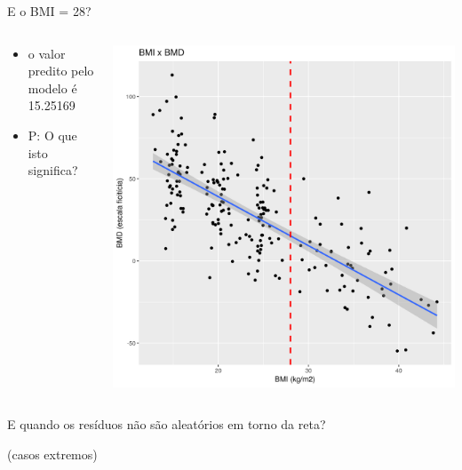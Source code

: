 \documentclass{beamer}
\begin{document}
\begin{frame}{E o BMI = 28?}
  \begin{columns}
    \begin{column}{5cm}
      \begin{itemize}
        \small
      \item o valor predito pelo modelo é 15.25169
      \item P: O que isto significa?
      \end{itemize}
    \end{column}
    \begin{column}{5cm}
      \begin{center}
        \includegraphics[width=1.1\textwidth]{Cap18-19/pratica-plot3}
      \end{center}
    \end{column}
  \end{columns}
\end{frame}

\begin{frame}
  \begin{center}
    \Large
    E quando os resíduos não são aleatórios em torno da reta?
  \end{center}
  \vfill
  \hfill \footnotesize (casos extremos)
\end{frame}
\end{document}
